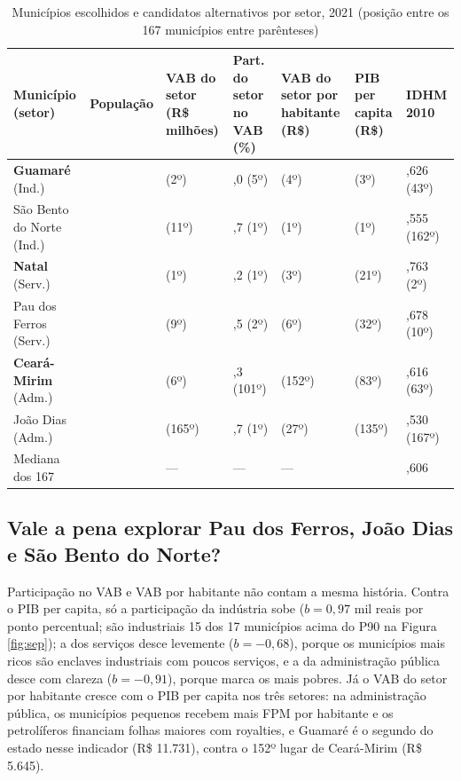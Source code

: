 \documentclass[12pt,a4paper]{article}
\newcommand{\fonte}[1]{\par\vspace{2pt}{\centering\small #1\par}\vspace{2pt}}
\begin{document}
\begin{table}[!htb]
\centering
\caption{Municípios escolhidos e candidatos alternativos por setor, 2021 (posição entre os 167 municípios entre parênteses)}
\label{tab:c}
\footnotesize\setlength{\tabcolsep}{3pt}
\begin{tabular}{@{}>{\raggedright\arraybackslash}p{3.5cm}>{\centering\arraybackslash}p{1.6cm}>{\centering\arraybackslash}p{1.9cm}>{\centering\arraybackslash}p{1.6cm}>{\centering\arraybackslash}p{2.1cm}>{\centering\arraybackslash}p{2.0cm}>{\centering\arraybackslash}p{2.0cm}@{}}
\toprule
Município (setor) & População & VAB do setor (R\$ milhões) & Part. do setor no VAB (\%) & VAB do setor por habitante (R\$) & PIB per capita (R\$) & IDHM 2010 \\
\midrule
\textbf{Guamaré} (Ind.) & 16.261 & 1.471 (2º) & 75,0 (5º) & 90.463 (4º) & 125.585 (3º) & 0,626 (43º) \\
São Bento do Norte (Ind.) & 2.687 & 452 (11º) & 88,7 (1º) & 168.285 (1º) & 204.407 (1º) & 0,555 (162º) \\
\textbf{Natal} (Serv.) & 896.708 & 13.348 (1º) & 64,2 (1º) & 14.885 (3º) & 26.972 (21º) & 0,763 (2º) \\
Pau dos Ferros (Serv.) & 30.802 & 389 (9º) & 63,5 (2º) & 12.631 (6º) & 23.029 (32º) & 0,678 (10º) \\
\textbf{Ceará-Mirim} (Adm.) & 74.268 & 419 (6º) & 46,3 (101º) & 5.645 (152º) & 13.494 (83º) & 0,616 (63º) \\
João Dias (Adm.) & 2.653 & 20 (165º) & 72,7 (1º) & 7.473 (27º) & 10.551 (135º) & 0,530 (167º) \\
\midrule
Mediana dos 167 & 8.297 & --- & --- & --- & 13.469 & 0,606 \\
\bottomrule
\end{tabular}
\fonte{Fonte: elaborada pelo autor (2026) com dados do IBGE (2023) e IBGE Cidades. Nota: em negrito, os escolhidos; VAB por habitante = VAB do setor / população de 2021.}
\end{table}

\subsection{Vale a pena explorar Pau dos Ferros, João Dias e São Bento do Norte?}

Participação no VAB e VAB por habitante não contam a mesma história. Contra o PIB per capita, só a participação da indústria sobe ($b = 0{,}97$ mil reais por ponto percentual; são industriais 15 dos 17 municípios acima do P90 na Figura \ref{fig:sep}); a dos serviços desce levemente ($b = -0{,}68$), porque os municípios mais ricos são enclaves industriais com poucos serviços, e a da administração pública desce com clareza ($b = -0{,}91$), porque marca os mais pobres. Já o VAB do setor por habitante cresce com o PIB per capita nos três setores: na administração pública, os municípios pequenos recebem mais FPM por habitante e os petrolíferos financiam folhas maiores com royalties, e Guamaré é o segundo do estado nesse indicador (R\$ 11.731), contra o 152º lugar de Ceará-Mirim (R\$ 5.645).
\end{document}
